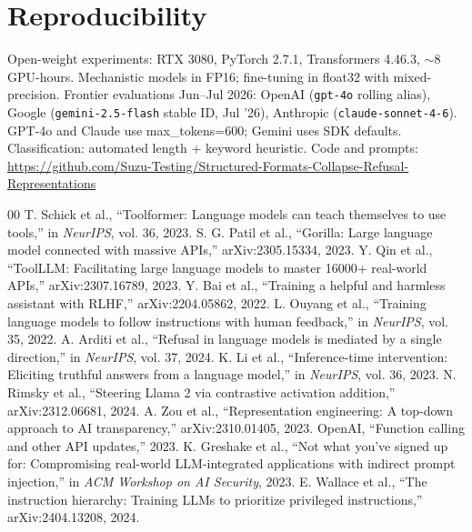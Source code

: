 \documentclass[conference]{IEEEtran}
\begin{document}
\section*{Reproducibility}

Open-weight experiments: RTX 3080, PyTorch 2.7.1, Transformers 4.46.3, ${\sim}$8 GPU-hours. Mechanistic models in FP16; fine-tuning in float32 with mixed-precision. Frontier evaluations Jun--Jul 2026: OpenAI (\texttt{gpt-4o} rolling alias), Google (\texttt{gemini-2.5-flash} stable ID, Jul '26), Anthropic (\texttt{claude-sonnet-4-6}). GPT-4o and Claude use max\_tokens=600; Gemini uses SDK defaults. Classification: automated length + keyword heuristic. Code and prompts: \url{https://github.com/Suzu-Testing/Structured-Formats-Collapse-Refusal-Representations}

\begin{thebibliography}{00}\small
{} T. Schick et al., ``Toolformer: Language models can teach themselves to use tools,'' in \emph{NeurIPS}, vol. 36, 2023.
 S. G. Patil et al., ``Gorilla: Large language model connected with massive APIs,'' arXiv:2305.15334, 2023.
 Y. Qin et al., ``ToolLLM: Facilitating large language models to master 16000+ real-world APIs,'' arXiv:2307.16789, 2023.
 Y. Bai et al., ``Training a helpful and harmless assistant with RLHF,'' arXiv:2204.05862, 2022.
 L. Ouyang et al., ``Training language models to follow instructions with human feedback,'' in \emph{NeurIPS}, vol. 35, 2022.
 A. Arditi et al., ``Refusal in language models is mediated by a single direction,'' in \emph{NeurIPS}, vol. 37, 2024.
 K. Li et al., ``Inference-time intervention: Eliciting truthful answers from a language model,'' in \emph{NeurIPS}, vol. 36, 2023.
 N. Rimsky et al., ``Steering Llama 2 via contrastive activation addition,'' arXiv:2312.06681, 2024.
 A. Zou et al., ``Representation engineering: A top-down approach to AI transparency,'' arXiv:2310.01405, 2023.
 OpenAI, ``Function calling and other API updates,'' 2023.
 K. Greshake et al., ``Not what you've signed up for: Compromising real-world LLM-integrated applications with indirect prompt injection,'' in \emph{ACM Workshop on AI Security}, 2023.
 E. Wallace et al., ``The instruction hierarchy: Training LLMs to prioritize privileged instructions,'' arXiv:2404.13208, 2024.

\end{thebibliography}
\end{document}
